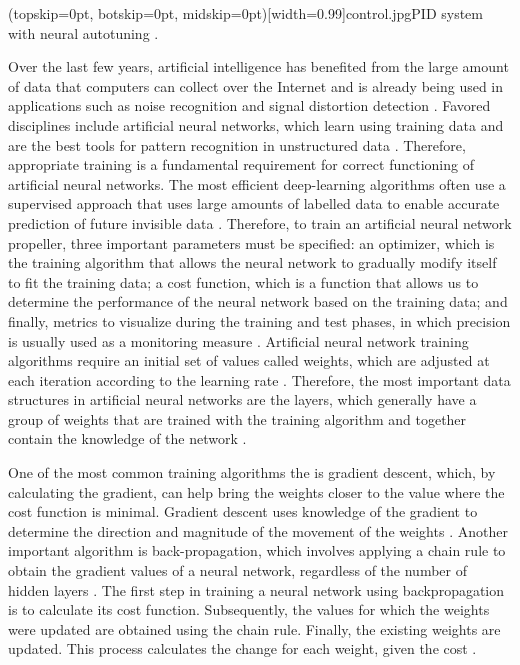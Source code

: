 \documentclass{ieeeaccess}
\begin{document}
\Figure[ht!](topskip=0pt, botskip=0pt, midskip=0pt)[width=0.99\columnwidth]{control.jpg}{PID system with neural autotuning \cite{hernandez-alvarado_neural_2016}\label{fig:Figcontrol}.}

Over the last few years, artificial intelligence has benefited from the large amount of data that computers can collect over the Internet and is already being used in applications such as noise recognition and signal distortion detection \cite{junyan_research_2020}. Favored disciplines include artificial neural networks, which learn using training data and are the best tools for pattern recognition in unstructured data \cite{hurbans_grokking_2020}. Therefore, appropriate training is a fundamental requirement for correct functioning of artificial neural networks. The most efficient deep-learning algorithms often use a supervised approach that uses large amounts of labelled data to enable accurate prediction of future invisible data \cite{jarrahi_artificial_2022}. Therefore, to train an artificial neural network propeller, three important parameters must be specified: an optimizer, which is the training algorithm that allows the neural network to gradually modify itself to fit the training data; a cost function, which is a function that allows us to determine the performance of the neural network based on the training data; and finally, metrics to visualize during the training and test phases, in which precision is usually used as a monitoring measure \cite{chollet_deep_2021}. Artificial neural network training algorithms require an initial set of values called weights, which are adjusted at each iteration according to the learning rate \cite{hurbans_grokking_2020}. Therefore, the most important data structures in artificial neural networks are the layers, which generally have a group of weights that are trained with the training algorithm and together contain the knowledge of the network \cite{chollet_deep_2021}.

One of the most common training algorithms the is gradient descent, which, by calculating the gradient, can help bring the weights closer to the value where the cost function is minimal. Gradient descent uses knowledge of the gradient to determine the direction and magnitude of the movement of the weights \cite{hurbans_grokking_2020}. Another important algorithm is back-propagation, which involves applying a chain rule to obtain the gradient values of a neural network, regardless of the number of hidden layers \cite{chollet_deep_2021}. The first step in training a neural network using backpropagation is to calculate its cost function. Subsequently, the values for which the weights were updated are obtained using the chain rule. Finally, the existing weights are updated. This process calculates the change for each weight, given the cost \cite{hurbans_grokking_2020}.
\end{document}
